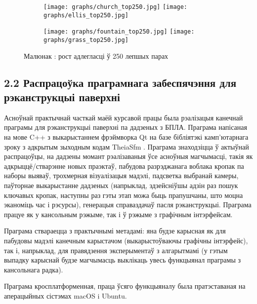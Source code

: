 \begin{figure}[h]
\centering
\begin{subfigure}{.5\textwidth}
  \centering
  \texttt{[image: graphs/church\_top250.jpg]}
  \texttt{[image: graphs/ellis\_top250.jpg]}
\end{subfigure}%
\begin{subfigure}{.5\textwidth}
  \centering
  \texttt{[image: graphs/fountain\_top250.jpg]}
  \texttt{[image: graphs/grass\_top250.jpg]}
\end{subfigure}%
\captionsetup{labelformat=empty,justification=centering}
\caption{Малюнак : рост адлегласці ў 250 лепшых парах}
\label{fig:best250matches}
\end{figure}

%
%
%
%

\subsection*{2.2 Распрацоўка праграмнага забеспячэння для рэканструкцыі паверхні}

Асноўнай практычнай часткай маёй курсавой працы была рэалізацыя канечнай праграмы для рэканструкцыі паверхні па дадзеных
з БПЛА. Праграма напісаная на мове C++ з выкарыстаннем фрэймворка Qt на базе бібліятэкі камп'ютарнага зроку
з адкрытым зыходным кодам TheiaSfm \cite{theia-sfm}. Праграма
знаходзіцца ў актыўнай распрацоўцы, на дадзены момант рэалізаваныя ўсе асноўныя магчымасці, такія як адкрыццё/стварэнне новых праэктаў,
пабудова разрэджанага воблака кропак па наборы выяваў, трохмерная візуалізацыя мадэлі, падсветка выбранай камеры, паўторнае выкарыстанне
дадзеных (напрыклад, здзейсніўшы адзін раз пошук ключавых кропак, наступны раз гэты этап можа быць прапушчаны, што моцна эканоміць час
і рэсурсы), генерацыя справаздачаў пасля рэканструкцыі. Праграма працуе як у кансольным рэжыме, так і ў рэжыме з графічным
інтэрфейсам.

Праграма ствараецца з практычнымі метадамі: яна будзе карысная як для пабудовы мадэлі канечным карыстачом (выкарыстоўваючы
графічны інтэрфейс), так і, напрыклад, для правядзення эксперыментаў з алгарытмамі (у гэтым выпадку карыснай будзе магчымасць
выклікаць увесь функцыянал праграмы з кансольнага радка).

Праграма кросплатформенная, праца ўсяго функцыяналу была пратэставаная на аперацыйных сістэмах macOS i Ubuntu.

